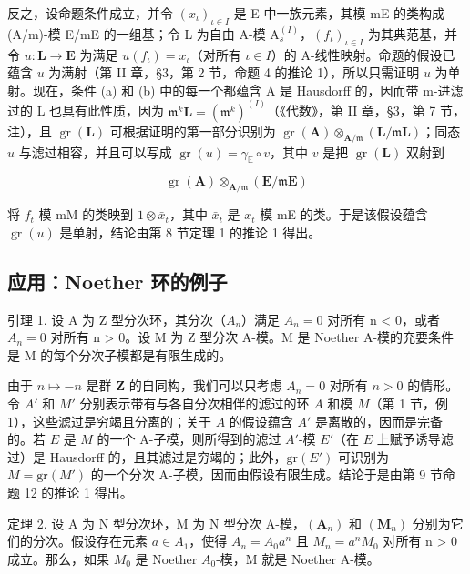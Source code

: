 	反之，设命题条件成立，并令 \((x_{\iota})_{\iota \in I}\) 是 E 中一族元素，其模 mE 的类构成 (A/m)-模 E/mE 的一组基；令 L 为自由 A-模 \(\mathrm{A}_s^{(I)}\)，\((f_{\iota})_{\iota \in I}\) 为其典范基，并令 \(u: \mathbf{L} \to \mathbf{E}\) 为满足 \(u(f_{\iota}) = x_{\iota}\)（对所有 \(\iota \in I\)）的 A-线性映射。命题的假设已蕴含 \(u\) 为满射（第 II 章，§3，第 2 节，命题 4 的推论 1），所以只需证明 \(u\) 为单射。现在，条件 (a) 和 (b) 中的每一个都蕴含 A 是 Hausdorff 的，因而带 m-进滤过的 L 也具有此性质，因为 \(\mathfrak{m}^k\mathbf{L} = (\mathfrak{m}^k)^{(I)}\)（《代数》，第 II 章，§3，第 7 节，注），且 \(\operatorname{gr}(\mathbf{L})\) 可根据证明的第一部分识别为 \(\operatorname{gr}(\mathbf{A}) \otimes_{\mathbf{A} / \mathfrak{m}} (\mathbf{L} / \mathfrak{m}\mathbf{L})\)；同态 \(u\) 与滤过相容，并且可以写成 \(\operatorname{gr}(u) = \gamma_{\mathbb{E}} \circ v\)，其中 \(v\) 是把 \(\operatorname{gr}(\mathbf{L})\) 双射到

\[
\operatorname{gr} (\mathbf {A}) \otimes_ {\mathbf {A} / \mathfrak {m}} (\mathbf {E} / \mathfrak {m} \mathbf {E})
\]

	将 \(f_{t}\) 模 mM 的类映到 \(1 \otimes \bar{x}_{t}\)，其中 \(\bar{x}_{t}\) 是 \(x_{t}\) 模 mE 的类。于是该假设蕴含 \(\operatorname{gr}(u)\) 是单射，结论由第 8 节定理 1 的推论 1 得出。

\subsection{应用：Noether 环的例子}

		引理 1. 设 A 为 Z 型分次环，其分次（\(A_{n}\)）满足 \(A_{n} = 0\) 对所有 n \textless{} 0，或者 \(A_{n} = 0\) 对所有 n \textgreater{} 0。设 M 为 Z 型分次 A-模。M 是 Noether A-模的充要条件是 M 的每个分次子模都是有限生成的。

	由于 \(n \mapsto -n\) 是群 \(\mathbf{Z}\) 的自同构，我们可以只考虑 \(A_n = 0\) 对所有 \(n > 0\) 的情形。令 \(A'\) 和 \(M'\) 分别表示带有与各自分次相伴的滤过的环 \(A\) 和模 \(M\)（第 1 节，例 1），这些滤过是穷竭且分离的；关于 \(A\) 的假设蕴含 \(A'\) 是离散的，因而是完备的。若 \(E\) 是 \(M\) 的一个 A-子模，则所得到的滤过 \(A'\)-模 \(E'\)（在 \(E\) 上赋予诱导滤过）是 Hausdorff 的，且其滤过是穷竭的；此外，\(\text{gr}(E')\) 可识别为 \(M = \text{gr}(M')\) 的一个分次 A-子模，因而由假设有限生成。结论于是由第 9 节命题 12 的推论 1 得出。

	定理 2. 设 A 为 N 型分次环，M 为 N 型分次 A-模，\((\mathbf{A}_{n})\) 和 \((\mathbf{M}_{n})\) 分别为它们的分次。假设存在元素 \(a \in A_{1}\)，使得 \(A_{n} = A_{0}a^{n}\) 且 \(M_{n} = a^{n}M_{0}\) 对所有 n \textgreater{} 0 成立。那么，如果 \(M_{0}\) 是 Noether \(A_{0}\)-模，M 就是 Noether A-模。

